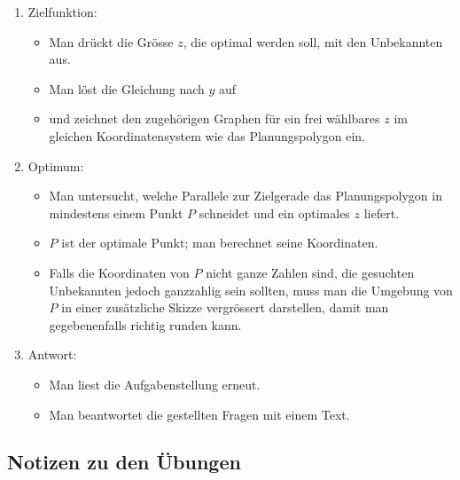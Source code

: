 \documentclass[%
11pt,%
twoside,%
titlepage,%
swissgerman,%
headsepline%
]{scrartcl}
\theoremstyle{definition}
\theoremstyle{plain}
\theoremstyle{plain}
\begin{document}
\begin{enumerate}
			\item Zielfunktion:
			\begin{itemize}
				\item Man drückt die Grösse $z$, die optimal werden soll, mit
				den Unbekannten aus.
				\item Man löst die Gleichung nach $y$ auf
				\item und zeichnet den zugehörigen Graphen für ein frei
				wählbares $z$ im gleichen Koordinatensystem wie das
				Planungspolygon ein.
			\end{itemize}
			\item Optimum:
			\begin{itemize}
				\item Man untersucht, welche Parallele zur Zielgerade das
				Planungspolygon in mindestens einem Punkt $P$ schneidet und ein
				optimales $z$ liefert.
				\item $P$ ist der optimale Punkt; man berechnet seine
				Koordinaten.
				\item Falls die Koordinaten von $P$ nicht ganze Zahlen sind, die
				gesuchten Unbekannten jedoch ganzzahlig sein sollten, muss man
				die Umgebung von $P$ in einer zusätzliche Skizze vergrössert
				darstellen, damit man gegebenenfalls richtig runden kann.
			\end{itemize}
			\item Antwort:
			\begin{itemize}
				\item Man liest die Aufgabenstellung erneut.
				\item Man beantwortet die gestellten Fragen mit einem Text.
			\end{itemize}
			
		\end{enumerate}

\clearpage

\subsection{Notizen zu den Übungen}
\end{document}
